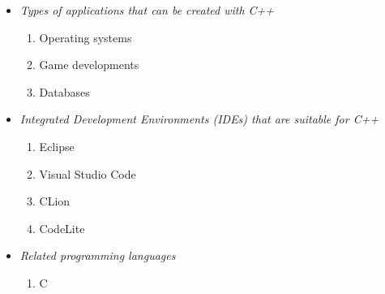 \documentclass{article}
\begin{document}
	
	\begin{itemize}
		\item \textit{Types of applications that can be created with C++}
		\begin{enumerate}
			\item Operating systems
			\item Game developments
			\item Databases
		\end{enumerate}
	\item \textit{Integrated Development Environments (IDEs) that are suitable for C++}
	\begin{enumerate}  
		\item Eclipse
		\item Visual Studio Code
		\item CLion
		\item CodeLite
	\end{enumerate} 
    \item \textit{Related programming languages}
    \begin{enumerate}
    	\item C
    \end{enumerate}
	\end{itemize}
\end{document}
